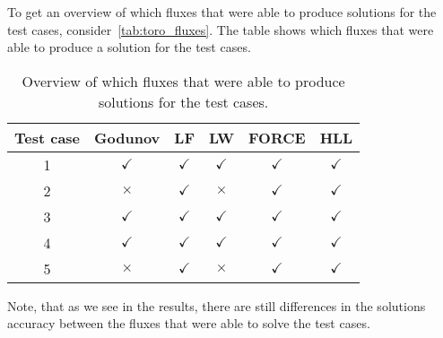 To get an overview of which fluxes that were able to produce solutions for the test cases, consider~\autoref{tab:toro_fluxes}.
The table shows which fluxes that were able to produce a solution for the test cases.
\begin{table}[H]
    \centering
    \begin{tabular}{c|c|c|c|c|c}
        \hline
        \textbf{Test case} & \textbf{Godunov} & \textbf{LF} & \textbf{LW} & \textbf{FORCE} & \textbf{HLL}   \\
        \hline\hline
        1 & $\checkmark$ & $\checkmark$ & $\checkmark$ & $\checkmark$ & $\checkmark$   \\
        2 & $\times$ & $\checkmark$ & $\times$ & $\checkmark$ & $\checkmark$ \\
        3 & $\checkmark$ & $\checkmark$ & $\checkmark$ & $\checkmark$ & $\checkmark$  \\
        4 & $\checkmark$ & $\checkmark$ & $\checkmark$ & $\checkmark$ & $\checkmark$  \\
        5 & $\times$ & $\checkmark$ & $\times$ & $\checkmark$ & $\checkmark$  \\
        \hline
    \end{tabular}
    \caption{Overview of which fluxes that were able to produce solutions for the test cases.}\label{tab:toro_fluxes}
\end{table}
Note, that as we see in the results, there are still differences in the solutions accuracy between the fluxes that were able to solve the test cases.


